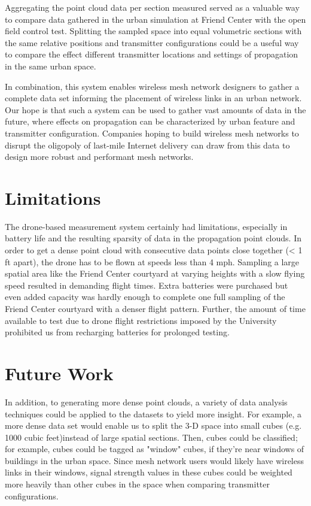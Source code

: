 \documentclass[pageno]{jpaper}
\begin{document}
Aggregating the point cloud data per section measured served as a valuable way to compare data gathered in the urban simulation at Friend Center with the open field control test. Splitting the sampled space into equal volumetric sections with the same relative positions and transmitter configurations could be a useful way to compare the effect different transmitter locations and settings of propagation in the same urban space.

In combination, this system enables wireless mesh network designers to gather a complete data set informing the placement of wireless links in an urban network. Our hope is that such a system can be used to gather vast amounts of data in the future, where effects on propagation can be characterized by urban feature and transmitter configuration. Companies hoping to build wireless mesh networks to disrupt the oligopoly of last-mile Internet delivery can draw from this data to design more robust and performant mesh networks.

\section{Limitations}
The drone-based measurement system certainly had limitations, especially in battery life and the resulting sparsity of data in the propagation point clouds. In order to get a dense point cloud with consecutive data points close together (< 1 ft apart), the drone has to be flown at speeds less than 4 mph. Sampling a large spatial area like the Friend Center courtyard at varying heights with a slow flying speed resulted in demanding flight times. Extra batteries were purchased but even added capacity was hardly enough to complete one full sampling of the Friend Center courtyard with a denser flight pattern. Further, the amount of time available to test due to drone flight restrictions imposed by the University prohibited us from recharging batteries for prolonged testing.

\section{Future Work}
In addition, to generating more dense point clouds, a variety of data analysis techniques could be applied to the datasets to yield more insight. For example, a more dense data set would enable us to split the 3-D space into small cubes (e.g. 1000 cubic feet)instead of large spatial sections. Then, cubes could be classified; for example, cubes could be tagged as "window" cubes, if they're near windows of buildings in the urban space. Since mesh network users would likely have wireless links in their windows, signal strength values in these cubes could be weighted more heavily than other cubes in the space when comparing transmitter configurations.
\end{document}
